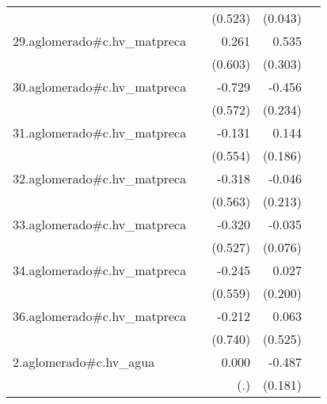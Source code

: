 {\begin{longtable}{l*{4}{D{.}{.}{-1}}}
            &                     &     (0.523)         &     (0.043)         &                     \\
\addlinespace
29.aglomerado#c.hv\_matpreca&                     &       0.261         &       0.535         &                     \\
            &                     &     (0.603)         &     (0.303)         &                     \\
\addlinespace
30.aglomerado#c.hv\_matpreca&                     &      -0.729         &      -0.456         &                     \\
            &                     &     (0.572)         &     (0.234)         &                     \\
\addlinespace
31.aglomerado#c.hv\_matpreca&                     &      -0.131         &       0.144         &                     \\
            &                     &     (0.554)         &     (0.186)         &                     \\
\addlinespace
32.aglomerado#c.hv\_matpreca&                     &      -0.318         &      -0.046         &                     \\
            &                     &     (0.563)         &     (0.213)         &                     \\
\addlinespace
33.aglomerado#c.hv\_matpreca&                     &      -0.320         &      -0.035         &                     \\
            &                     &     (0.527)         &     (0.076)         &                     \\
\addlinespace
34.aglomerado#c.hv\_matpreca&                     &      -0.245         &       0.027         &                     \\
            &                     &     (0.559)         &     (0.200)         &                     \\
\addlinespace
36.aglomerado#c.hv\_matpreca&                     &      -0.212         &       0.063         &                     \\
            &                     &     (0.740)         &     (0.525)         &                     \\
\addlinespace
2.aglomerado#c.hv\_agua&                     &       0.000         &      -0.487\sym{**} &                     \\
            &                     &         (.)         &     (0.181)         &                     \\

\end{longtable}}
